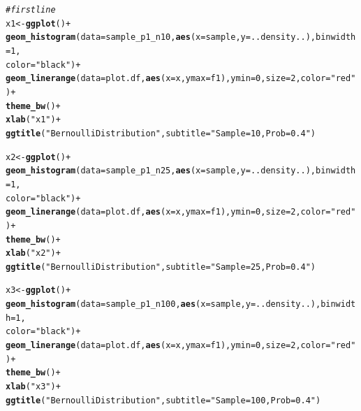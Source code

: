 \documentclass{article}\usepackage[]{graphicx}\usepackage[]{color}
\makeatletter
\newcommand{\hlnum}[1]{\textcolor[rgb]{0.686,0.059,0.569}{#1}}%
\newcommand{\hlstr}[1]{\textcolor[rgb]{0.192,0.494,0.8}{#1}}%
\newcommand{\hlcom}[1]{\textcolor[rgb]{0.678,0.584,0.686}{\textit{#1}}}%
\newcommand{\hlopt}[1]{\textcolor[rgb]{0,0,0}{#1}}%
\newcommand{\hlstd}[1]{\textcolor[rgb]{0.345,0.345,0.345}{#1}}%
\newcommand{\hlkwb}[1]{\textcolor[rgb]{0.69,0.353,0.396}{#1}}%
\newcommand{\hlkwc}[1]{\textcolor[rgb]{0.333,0.667,0.333}{#1}}%
\newcommand{\hlkwd}[1]{\textcolor[rgb]{0.737,0.353,0.396}{\textbf{#1}}}%
\newenvironment{kframe}{%
 \def\at@end@of@kframe{}%
 \ifinner\ifhmode%
  \def\at@end@of@kframe{\end{minipage}}%
  \begin{minipage}{\columnwidth}%
 \fi\fi%
 \def\FrameCommand##1{\hskip\@totalleftmargin \hskip-\fboxsep
 \colorbox{shadecolor}{##1}\hskip-\fboxsep
     \hskip-\linewidth \hskip-\@totalleftmargin \hskip\columnwidth}%
 \MakeFramed {\advance\hsize-\width
   \@totalleftmargin\z@ \linewidth\hsize
   \@setminipage}}%
 {\par\unskip\endMakeFramed%
 \at@end@of@kframe}
\newenvironment{knitrout}{}{} %
\makeatother
\begin{document}
\begin{enumerate}
\begin{enumerate}
\begin{knitrout}
\begin{kframe}
\begin{alltt}
\hlcom{#first line}
          \hlstd{x1}\hlkwb{<-}\hlkwd{ggplot}\hlstd{()}\hlopt{+}
          \hlkwd{geom_histogram}\hlstd{(}\hlkwc{data} \hlstd{= sample_p1_n10,} \hlkwd{aes}\hlstd{(}\hlkwc{x} \hlstd{= sample,} \hlkwc{y}\hlstd{=..density..),} \hlkwc{binwidth}\hlstd{=}\hlnum{1}\hlstd{,}
                         \hlkwc{color}\hlstd{=}\hlstr{"black"}\hlstd{)}\hlopt{+}
          \hlkwd{geom_linerange}\hlstd{(}\hlkwc{data}\hlstd{=plot.df,} \hlkwd{aes}\hlstd{(}\hlkwc{x}\hlstd{=x,} \hlkwc{ymax} \hlstd{= f1),} \hlkwc{ymin} \hlstd{=} \hlnum{0}\hlstd{,} \hlkwc{size}\hlstd{=}\hlnum{2}\hlstd{,} \hlkwc{color}\hlstd{=}\hlstr{"red"}\hlstd{)}\hlopt{+}
          \hlkwd{theme_bw}\hlstd{()} \hlopt{+}
          \hlkwd{xlab}\hlstd{(}\hlstr{"x1"}\hlstd{)}\hlopt{+}
          \hlkwd{ggtitle}\hlstd{(}\hlstr{"Bernoulli Distribution"}\hlstd{,}\hlkwc{subtitle} \hlstd{=} \hlstr{"Sample = 10, Prob =0.4"}\hlstd{)}

                \hlstd{x2}\hlkwb{<-}\hlkwd{ggplot}\hlstd{()}\hlopt{+}
          \hlkwd{geom_histogram}\hlstd{(}\hlkwc{data} \hlstd{= sample_p1_n25,} \hlkwd{aes}\hlstd{(}\hlkwc{x} \hlstd{= sample,} \hlkwc{y}\hlstd{=..density..),} \hlkwc{binwidth}\hlstd{=}\hlnum{1}\hlstd{,}
                         \hlkwc{color}\hlstd{=}\hlstr{"black"}\hlstd{)}\hlopt{+}
          \hlkwd{geom_linerange}\hlstd{(}\hlkwc{data}\hlstd{=plot.df,} \hlkwd{aes}\hlstd{(}\hlkwc{x}\hlstd{=x,} \hlkwc{ymax} \hlstd{= f1),} \hlkwc{ymin} \hlstd{=} \hlnum{0}\hlstd{,} \hlkwc{size}\hlstd{=}\hlnum{2}\hlstd{,} \hlkwc{color}\hlstd{=}\hlstr{"red"}\hlstd{)}\hlopt{+}
          \hlkwd{theme_bw}\hlstd{()} \hlopt{+}
          \hlkwd{xlab}\hlstd{(}\hlstr{"x2"}\hlstd{)}\hlopt{+}
          \hlkwd{ggtitle}\hlstd{(}\hlstr{"Bernoulli Distribution"}\hlstd{,}\hlkwc{subtitle} \hlstd{=} \hlstr{"Sample = 25, Prob =0.4"}\hlstd{)}

                \hlstd{x3}\hlkwb{<-}\hlkwd{ggplot}\hlstd{()}\hlopt{+}
          \hlkwd{geom_histogram}\hlstd{(}\hlkwc{data} \hlstd{= sample_p1_n100,} \hlkwd{aes}\hlstd{(}\hlkwc{x} \hlstd{= sample,} \hlkwc{y}\hlstd{=..density..),} \hlkwc{binwidth}\hlstd{=}\hlnum{1}\hlstd{,}
                         \hlkwc{color}\hlstd{=}\hlstr{"black"}\hlstd{)}\hlopt{+}
          \hlkwd{geom_linerange}\hlstd{(}\hlkwc{data}\hlstd{=plot.df,} \hlkwd{aes}\hlstd{(}\hlkwc{x}\hlstd{=x,} \hlkwc{ymax} \hlstd{= f1),} \hlkwc{ymin} \hlstd{=} \hlnum{0}\hlstd{,} \hlkwc{size}\hlstd{=}\hlnum{2}\hlstd{,} \hlkwc{color}\hlstd{=}\hlstr{"red"}\hlstd{)}\hlopt{+}
          \hlkwd{theme_bw}\hlstd{()} \hlopt{+}
          \hlkwd{xlab}\hlstd{(}\hlstr{"x3"}\hlstd{)}\hlopt{+}
          \hlkwd{ggtitle}\hlstd{(}\hlstr{"Bernoulli Distribution"}\hlstd{,}\hlkwc{subtitle} \hlstd{=} \hlstr{"Sample = 100, Prob =0.4"}\hlstd{)}


\end{alltt}
\end{kframe}
\end{knitrout}
\end{enumerate}
\end{enumerate}
\end{document}

